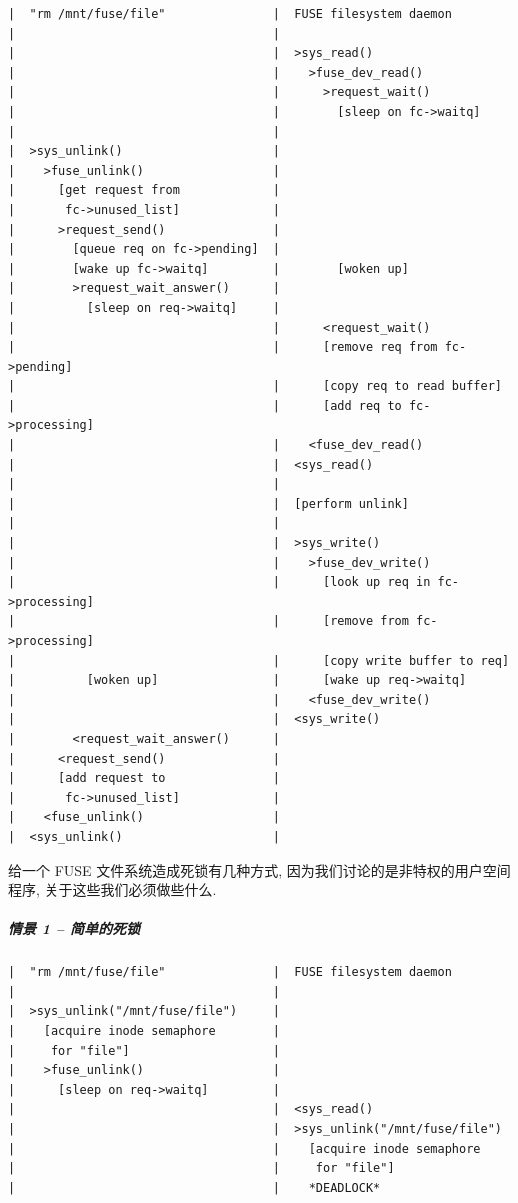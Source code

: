 \documentclass[nofonts, titlepage]{ctexart}
\begin{document}
\begin{verbatim}
|  "rm /mnt/fuse/file"               |  FUSE filesystem daemon
|                                    |
|                                    |  >sys_read()
|                                    |    >fuse_dev_read()
|                                    |      >request_wait()
|                                    |        [sleep on fc->waitq]
|                                    |
|  >sys_unlink()                     |
|    >fuse_unlink()                  |
|      [get request from             |
|       fc->unused_list]             |
|      >request_send()               |
|        [queue req on fc->pending]  |
|        [wake up fc->waitq]         |        [woken up]
|        >request_wait_answer()      |
|          [sleep on req->waitq]     |
|                                    |      <request_wait()
|                                    |      [remove req from fc->pending]
|                                    |      [copy req to read buffer]
|                                    |      [add req to fc->processing]
|                                    |    <fuse_dev_read()
|                                    |  <sys_read()
|                                    |
|                                    |  [perform unlink]
|                                    |
|                                    |  >sys_write()
|                                    |    >fuse_dev_write()
|                                    |      [look up req in fc->processing]
|                                    |      [remove from fc->processing]
|                                    |      [copy write buffer to req]
|          [woken up]                |      [wake up req->waitq]
|                                    |    <fuse_dev_write()
|                                    |  <sys_write()
|        <request_wait_answer()      |
|      <request_send()               |
|      [add request to               |
|       fc->unused_list]             |
|    <fuse_unlink()                  |
|  <sys_unlink()                     |
\end{verbatim}

给一个 FUSE 文件系统造成死锁有几种方式, 因为我们讨论的是非特权的用户空间
程序, 关于这些我们必须做些什么.

\subparagraph{情景 1 --
简单的死锁}\label{ux60c5ux666f-1-ux7b80ux5355ux7684ux6b7bux9501}

\begin{verbatim}
|  "rm /mnt/fuse/file"               |  FUSE filesystem daemon
|                                    |
|  >sys_unlink("/mnt/fuse/file")     |
|    [acquire inode semaphore        |
|     for "file"]                    |
|    >fuse_unlink()                  |
|      [sleep on req->waitq]         |
|                                    |  <sys_read()
|                                    |  >sys_unlink("/mnt/fuse/file")
|                                    |    [acquire inode semaphore
|                                    |     for "file"]
|                                    |    *DEADLOCK*
\end{verbatim}
\end{document}
